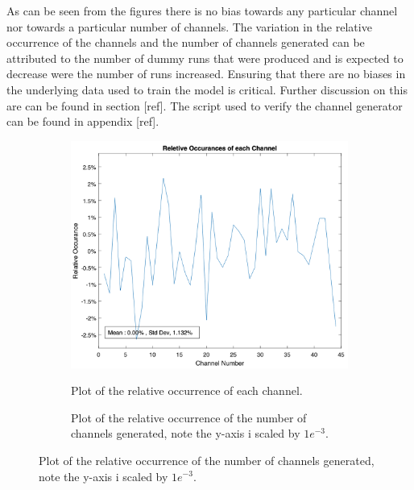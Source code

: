 As can be seen from the figures there is no bias towards any particular channel nor towards a particular number of channels. The variation in the relative occurrence of the channels and the number of channels generated can be attributed to the number of dummy runs that were produced and is expected to decrease were the number of runs increased. Ensuring that there are no biases in the underlying data used to train the model is critical. Further discussion on this are can be found in section [ref]. The script used to verify the channel generator can be found in appendix [ref].
\begin{figure}
    \centering
    \caption{Results of 5000 dummy runs of the channel generator.}
    \label{fig:tw:dummy_runs}
    \begin{subfigure}{0.5\textwidth}
        \centering
    \caption{Plot of the relative occurrence of each channel.}
    \includegraphics[width=\textwidth]{images/technical_work/section_2_data generation/rel_occur_ch.png}
    \label{fig:tw:data_gen:rel_ch}    
    \end{subfigure}
    \begin{subfigure}{0.5\textwidth}
        \centering
        \caption{Plot of the relative occurrence of the number of channels generated, note the y-axis i scaled by $1e^{-3}$.}

\end{subfigure}
\end{figure}

